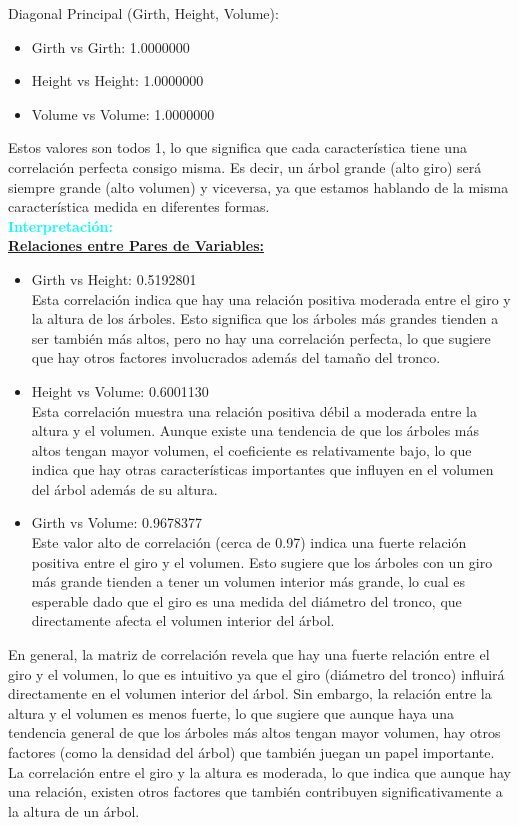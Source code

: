 \documentclass{article}
\begin{document}
Diagonal Principal (Girth, Height, Volume):
\begin{itemize}
    \item Girth vs Girth: 1.0000000
    \item Height vs Height: 1.0000000
    \item Volume vs Volume: 1.0000000
\end{itemize}
Estos valores son todos 1, lo que significa que cada característica tiene una correlación perfecta consigo misma. Es decir, un árbol grande (alto giro) será siempre grande (alto volumen) y viceversa, ya que estamos hablando de la misma característica medida en diferentes formas.\\
\large\textbf{\textcolor{cyan}{Interpretación:}}\\
\textbf{\underline{Relaciones entre Pares de Variables:}}
\begin{itemize}
    \item Girth vs Height: 0.5192801 \\ Esta correlación indica que hay una relación positiva moderada entre el giro y la altura de los árboles. Esto significa que los árboles más grandes tienden a ser también más altos, pero no hay una correlación perfecta, lo que sugiere que hay otros factores involucrados además del tamaño del tronco.
    \item Height vs Volume: 0.6001130 \\ Esta correlación muestra una relación positiva débil a moderada entre la altura y el volumen. Aunque existe una tendencia de que los árboles más altos tengan mayor volumen, el coeficiente es relativamente bajo, lo que indica que hay otras características importantes que influyen en el volumen del árbol además de su altura.
    \item Girth vs Volume: 0.9678377 \\ Este valor alto de correlación (cerca de 0.97) indica una fuerte relación positiva entre el giro y el volumen. Esto sugiere que los árboles con un giro más grande tienden a tener un volumen interior más grande, lo cual es esperable dado que el giro es una medida del diámetro del tronco, que directamente afecta el volumen interior del árbol.
\end{itemize}
En general, la matriz de correlación revela que hay una fuerte relación entre el giro y el volumen, lo que es intuitivo ya que el giro (diámetro del tronco) influirá directamente en el volumen interior del árbol. Sin embargo, la relación entre la altura y el volumen es menos fuerte, lo que sugiere que aunque haya una tendencia general de que los árboles más altos tengan mayor volumen, hay otros factores (como la densidad del árbol) que también juegan un papel importante. La correlación entre el giro y la altura es moderada, lo que indica que aunque hay una relación, existen otros factores que también contribuyen significativamente a la altura de un árbol.
\newpage
\end{document}
